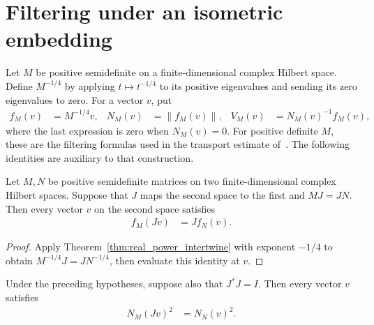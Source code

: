 \section{Filtering under an isometric embedding}
\label{sec:filtering_intertwine}

Let $M$ be positive semidefinite on a finite-dimensional complex Hilbert
space. Define $M^{-1/4}$ by applying $t\mapsto t^{-1/4}$ to its positive
eigenvalues and sending its zero eigenvalues to zero. For a vector $v$, put
\begin{align}
  f_M(v)&=M^{-1/4}v, &
  N_M(v)&=\|f_M(v)\|, &
  V_M(v)&=N_M(v)^{-1}f_M(v),
\end{align}
where the last expression is zero when $N_M(v)=0$.
For positive definite $M$, these are the filtering formulas used in the
transport estimate of~\cite{OpenAI2026AreaLaw}.
The following identities are auxiliary to that construction.

\begin{theorem}
  \label{thm:filtered_raw_intertwine}
  \leanok
  Let $M,N$ be positive semidefinite matrices on two finite-dimensional
  complex Hilbert spaces. Suppose that $J$ maps the second space to the
  first and $MJ=JN$. Then every vector $v$ on the second space satisfies
  \begin{align}
    f_M(Jv)&=Jf_N(v).
  \end{align}
\end{theorem}

\begin{proof}
  \leanok
  Apply Theorem~\ref{thm:real_power_intertwine} with exponent $-1/4$
  to obtain $M^{-1/4}J=JN^{-1/4}$, then evaluate this identity at $v$.
\end{proof}

\begin{theorem}
  \label{thm:filtered_norm_sq_intertwine}
  \leanok
  Under the preceding hypotheses, suppose also that $J^*J=I$.
  Then every vector $v$ satisfies
  \begin{align}
    N_M(Jv)^2&=N_N(v)^2.
  \end{align}
\end{theorem}

